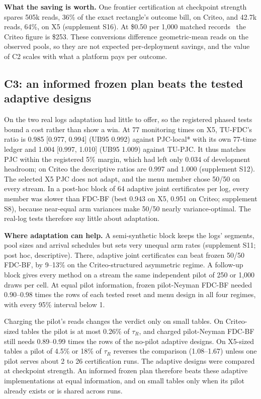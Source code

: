 \documentclass[sigconf,anonymous,review]{acmart}
\begin{document}
\textbf{What the saving is worth.} One frontier certification at checkpoint strength spares 505k reads, 36\% of the exact rectangle's outcome bill, on Criteo, and 42.7k reads, 64\%, on X5 (supplement S16). At \$0.50 per 1,000 matched records~\citep{awscleanrooms2026pricing} the Criteo figure is \$253. These conversions difference geometric-mean reads on the observed pools, so they are not expected per-deployment savings, and the value of C2 scales with what a platform pays per outcome.

\subsection{C3: an informed frozen plan beats the tested adaptive designs}\label{sec:c3}

On the two real logs adaptation had little to offer, so the registered phased tests bound a cost rather than show a win. At 77 monitoring times on X5, TU-FDC's ratio is 0.985 [0.977, 0.994] (UB95 0.992) against PJC-local* with its own 77-time ledger and 1.004 [0.997, 1.010] (UB95 1.009) against TU-PJC. It thus matches PJC within the registered 5\% margin, which had left only 0.034 of development headroom; on Criteo the descriptive ratios are 0.997 and 1.000 (supplement S12). The selected X5 PJC does not adapt, and the menu member chose 50/50 on every stream. In a post-hoc block of 64 adaptive joint certificates per log, every member was slower than FDC-BF (best 0.943 on X5, 0.951 on Criteo; supplement S8), because near-equal arm variances make 50/50 nearly variance-optimal. The real-log tests therefore say little about adaptation.

\textbf{Where adaptation can help.} A semi-synthetic block keeps the logs' segments, pool sizes and arrival schedules but sets very unequal arm rates (supplement S11; post hoc, descriptive). There, adaptive joint certificates can beat frozen 50/50 FDC-BF, by 9--13\% on the Criteo-structured asymmetric regime. A follow-up block gives every method on a stream the same independent pilot of 250 or 1,000 draws per cell. At equal pilot information, frozen pilot-Neyman FDC-BF needed 0.90--0.98 times the rows of each tested reset and menu design in all four regimes, with every 95\% interval below 1.

Charging the pilot's reads changes the verdict only on small tables. On Criteo-sized tables the pilot is at most 0.26\% of $\tau_R$, and charged pilot-Neyman FDC-BF still needs 0.89--0.99 times the rows of the no-pilot adaptive designs. On X5-sized tables a pilot of 4.5\% or 18\% of $\tau_R$ reverses the comparison (1.08--1.67) unless one pilot serves about 2 to 26 certification runs. The adaptive designs were compared at checkpoint strength. An informed frozen plan therefore beats these adaptive implementations at equal information, and on small tables only when its pilot already exists or is shared across runs.
\end{document}
